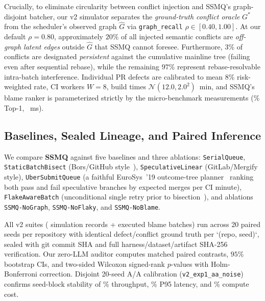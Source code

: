 

Crucially, to eliminate circularity between conflict injection and SSMQ's graph-disjoint batcher, our v2 simulator separates the \emph{ground-truth conflict oracle} $G^*$ from the scheduler's observed graph $\hat{G}$ via \texttt{graph\_recall} $\rho \in [0.40, 1.00]$. At our default $\rho = 0.80$, approximately $20\%$ of all injected semantic conflicts are \emph{off-graph latent edges} outside $\hat{G}$ that SSMQ cannot foresee. Furthermore, $3\%$ of conflicts are designated \emph{persistent} against the cumulative mainline tree (failing even after sequential rebase), while the remaining $97\%$ represent rebase-resolvable intra-batch interference. Individual PR defects are calibrated to mean $8\%$ risk-weighted rate, CI workers $W=8$, build times $\mathcal{N}(12.0, 2.0^2)$~min, and SSMQ's blame ranker is parameterized strictly by the micro-benchmark measurements (\BenchASTTopOnePct{}\% Top-1, \BenchASTMs{}~ms).

\subsection{Baselines, Sealed Lineage, and Paired Inference}
We compare \textbf{SSMQ} against five baselines and three ablations: \texttt{SerialQueue}, \texttt{StaticBatchBisect} (Bors/GitHub style~\cite{fallahzadeh2023accelerating}), \texttt{SpeculativeLinear} (GitLab/Mergify style), \texttt{UberSubmitQueue} (a faithful EuroSys~'19 outcome-tree planner~\cite{ananthanarayanan2019keeping} ranking both pass and fail speculative branches by expected merges per CI minute), \texttt{FlakeAwareBatch} (unconditional single retry prior to bisection~\cite{henderson2023flake}), and ablations \texttt{SSMQ-NoGraph}, \texttt{SSMQ-NoFlaky}, and \texttt{SSMQ-NoBlame}.

All \TotalSealedRuns{} v2 suites (\TotalSealedRecords{} simulation records + \BenchTotalBatches{} executed blame batches) run across 20 paired seeds per repository with identical defect/conflict ground truth per `(repo, seed)`, sealed with git commit SHA and full harness/dataset/artifact SHA-256 verification. Our zero-LLM auditor computes matched paired contrasts, $95\%$ bootstrap CIs, and two-sided Wilcoxon signed-rank $p$-values with Holm-Bonferroni correction. Disjoint 20-seed A/A calibration (\texttt{v2\_exp1\_aa\_noise}) confirms seed-block stability of \AANoiseThroughputPct{}\% throughput, \AANoiseLatencyPct{}\% P95 latency, and \AANoiseComputePct{}\% compute cost.
